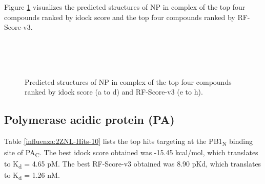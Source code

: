 Figure \ref{influenza:2IQH-Hits-4} visualizes the predicted structures of NP in complex of the top four compounds ranked by idock score and the top four compounds ranked by RF-Score-v3.

\begin{figure}
\centering
{}
\\
\\
\\
\caption{Predicted structures of NP in complex of the top four compounds ranked by idock score (a to d) and RF-Score-v3 (e to h).}
\label{influenza:2IQH-Hits-4}
\end{figure}

\subsection{Polymerase acidic protein (PA)}

Table \ref{influenza:2ZNL-Hits-10} lists the top hits targeting at the PB1\textsubscript{N} binding site of PA\textsubscript{C}. The best idock score obtained was -15.45 kcal/mol, which translates to K\textsubscript{d} = 4.65 pM. The best RF-Score-v3 obtained was 8.90 pKd, which translates to K\textsubscript{d} = 1.26 nM.

